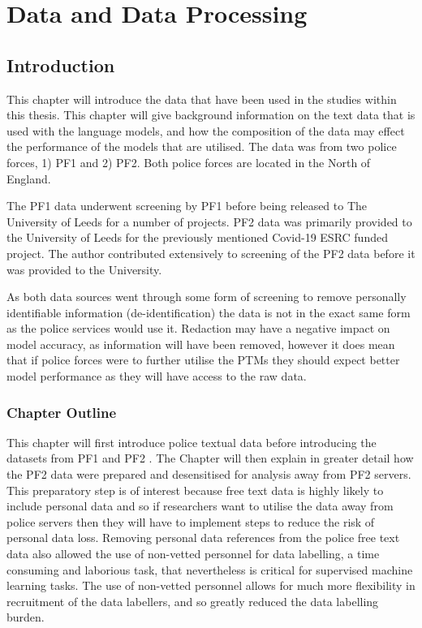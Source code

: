 \chapter{Data and Data Processing}


\section{Introduction} 

This chapter will introduce the data that have been used in the studies within this thesis. This chapter will give background information on the text data that is used with the language models, and how the composition of the data may effect the performance of the models that are utilised. The data was from two police forces, 1) PF1  and 2) PF2. Both police forces are located in the North of England. 

The PF1 data underwent screening by PF1 before being released to The University of Leeds for a number of projects. PF2 data was primarily provided to the University of Leeds for the previously mentioned Covid-19 ESRC funded project. The author contributed extensively to screening of the PF2 data before it was provided to the University.

As both data sources went through some form of screening to remove personally identifiable information (de-identification) the data is not in the exact same form as the police services would use it. Redaction may have a negative impact on model accuracy, as information will have been removed, however it does mean that if police forces were to further utilise the PTMs they should expect better model performance as they will have access to the raw data.

\subsection{Chapter Outline}
This chapter will first introduce police textual data  before introducing the datasets from PF1 and PF2 . The Chapter will then explain in greater detail how the PF2 data were prepared and desensitised for analysis away from PF2 servers. This preparatory step is of interest because free text data is highly likely to include personal data and so if researchers want to utilise the data away from police servers then they will have to implement steps to reduce the risk of personal data loss. Removing personal data references from the police free text data also allowed the use of non-vetted personnel for data labelling, a time consuming and laborious task, that nevertheless is critical for supervised machine learning tasks. The use of non-vetted personnel allows for much more flexibility in recruitment of the data labellers, and so greatly reduced the data labelling burden. 


